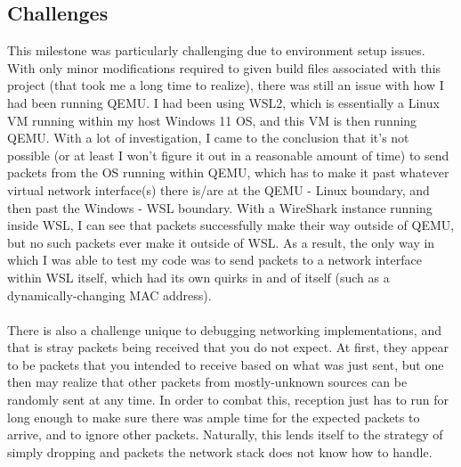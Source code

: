 \subsection{Challenges}
This milestone was particularly challenging due to environment setup issues. With only minor modifications required to given build files associated with this project (that took me a long time to realize), there was still an issue with how I had been running QEMU. I had been using WSL2, which is essentially a Linux VM running within my host Windows 11 OS, and this VM is then running QEMU. With a lot of investigation, I came to the conclusion that it's not possible (or at least I won't figure it out in a reasonable amount of time) to send packets from the OS running within QEMU, which has to make it past whatever virtual network interface(s) there is/are at the QEMU - Linux boundary, and then past the Windows - WSL boundary. With a WireShark instance running inside WSL, I can see that packets successfully make their way outside of QEMU, but no such packets ever make it outside of WSL. As a result, the only way in which I was able to test my code was to send packets to a network interface within WSL itself, which had its own quirks in and of itself (such as a dynamically-changing MAC address).
\\\\
There is also a challenge unique to debugging networking implementations, and that is stray packets being received that you do not expect. At first, they appear to be packets that you intended to receive based on what was just sent, but one then may realize that other packets from mostly-unknown sources can be randomly sent at any time. In order to combat this, reception just has to run for long enough to make sure there was ample time for the expected packets to arrive, and to ignore other packets. Naturally, this lends itself to the strategy of simply dropping and packets the network stack does not know how to handle.
